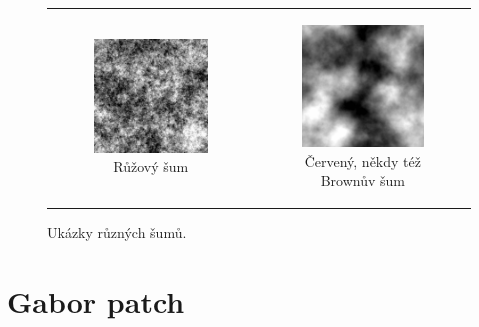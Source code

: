 \begin{figure}[h!]
\begin{tabular}{cc}
\begin{subfigure}{0.45\textwidth}
  \centering
  \includegraphics[width=.8\linewidth]{img/pink_noise}
  \caption{Růžový šum} 
\end{subfigure}&
\begin{subfigure}{0.45\textwidth}
  \centering
  \includegraphics[width=.8\linewidth]{img/brown_noise}
  \caption{Červený, někdy též Brownův šum} 
\end{subfigure}%
\end{tabular} 
\caption{Ukázky různých šumů.} 
\label{obr:noise:example} 
 
\end{figure}
\section{Gabor patch}

